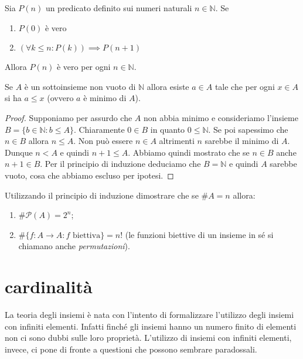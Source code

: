 \documentclass[italian,a4paper,twosides,headinclude]{scrbook}
\renewcommand{\P}{\mathcal P}
\newcommand{\NN}{\mathbb N}
\begin{document}
\begin{theorem}
Sia $P(n)$ un predicato definito sui numeri naturali $n\in \NN$.
Se
\begin{enumerate}
\item $P(0)$ è vero
\item $(\forall k\le n\colon P(k))\implies P(n+1)$
\end{enumerate}
Allora $P(n)$ è vero per ogni $n\in \NN$.
\end{theorem}

\begin{theorem}[buon ordinamento di $\NN$]
Se $A$ è un sottoinsieme non vuoto di $\NN$ allora esiste $a \in A$
tale che per ogni $x\in A$ si ha $a\le x$ (ovvero $a$ è minimo di $A$).
\end{theorem}
%
\begin{proof}
Supponiamo per assurdo che $A$ non abbia minimo e consideriamo l'insieme
$B=\{b\in \NN\colon b \le A\}$.
Chiaramente $0\in B$ in quanto $0\le \NN$. Se poi sapessimo che $n\in B$
allora $n\le A$. Non può essere $n\in A$ altrimenti $n$ sarebbe il minimo di $A$. Dunque $n < A$ e quindi $n+1 \le A$. Abbiamo quindi mostrato che se $n\in B$ anche $n+1\in B$. Per il principio di induzione deduciamo che $B=\NN$ e quindi $A$ sarebbe vuoto, cosa che abbiamo escluso per ipotesi.
\end{proof}

\begin{exercise}
Utilizzando il principio di induzione dimostrare che se $\# A = n$ allora:
\begin{enumerate}
    \item $\# \P(A) = 2^n$;
    \item $\# \{f\colon A \to A\colon \text{$f$ biettiva}\} = n!$
      (le funzioni biettive di un insieme in sé si chiamano anche
      \emph{permutazioni}).
\end{enumerate}
\end{exercise}

\section{cardinalità}

La teoria degli insiemi è nata con l'intento di formalizzare l'utilizzo degli
insiemi con infiniti elementi. Infatti finché gli insiemi hanno un numero finito
di elementi non ci sono dubbi sulle loro proprietà. L'utilizzo di insiemi con
infiniti elementi, invece, ci pone di fronte a questioni che possono sembrare
paradossali.
\end{document}
